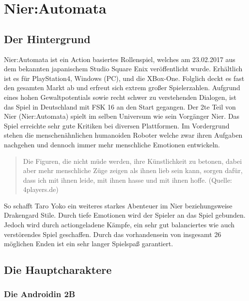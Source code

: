 
\chapter{Nier:Automata}
\section{Der Hintergrund}
Nier:Automata ist ein Action basiertes Rollenspiel, welches am 23.02.2017 aus dem bekannten japanischem Studio Square Enix veröffentlicht wurde. Erhältlich ist es für PlayStation4, Windows (PC), und die XBox-One. Folglich deckt es fast den gesamten Markt ab und erfreut sich extrem großer Spielerzahlen. Aufgrund eines hohen Gewaltpotentials sowie recht schwer zu verstehenden Dialogen, ist das Spiel in Deutschland mit FSK 16 an den Start gegangen. Der 2te Teil von Nier (Nier:Automata) spielt im selben Universum wie sein Vorgänger Nier. Das Spiel erreichte sehr gute Kritiken bei diversen Plattformen. Im Vordergrund stehen die menschenähnlichen humanoiden Roboter welche zwar ihren Aufgaben nachgehen und dennoch immer mehr menschliche Emotionen entwickeln.

  \begin{quote}
	Die Figuren, die nicht müde werden, ihre Künstlichkeit zu betonen, dabei aber mehr menschliche Züge zeigen als ihnen lieb sein kann, sorgen dafür, dass ich mit ihnen leide, mit ihnen hasse und mit ihnen hoffe. (Quelle: 4players.de)
	\end{quote}

So schafft Taro Yoko ein weiteres starkes Abenteuer im Nier beziehungsweise Drakengard Stile. Durch tiefe Emotionen wird der Spieler an das Spiel gebunden. Jedoch wird durch actiongeladene Kämpfe, ein sehr gut balanciertes wie auch verstörendes Spiel geschaffen. 
Durch das vorhandensein von insgesamt 26 möglichen Enden ist ein sehr langer Spielspaß garantiert.

\section{Die Hauptcharaktere}

\subsection{Die Androidin 2B}

